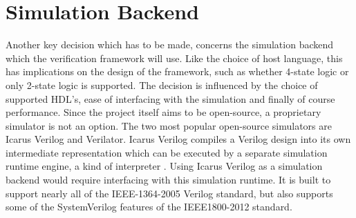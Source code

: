 \section{Simulation Backend} %

Another key decision which has to be made, concerns the simulation backend which the verification framework will use.
Like the choice of host language, this has implications on the design of the framework, such as whether 4-state logic
or only 2-state logic is supported.
The decision is influenced by the choice of supported HDL's, ease of interfacing with the simulation and
finally of course performance. Since the project itself aims to be open-source, a proprietary simulator
is not an option. The two most popular open-source simulators are Icarus Verilog and Verilator. Icarus Verilog
compiles a Verilog design into its own intermediate representation which can be executed by a separate simulation
runtime engine, a kind of interpreter \cite{iverilog}. Using Icarus Verilog as a simulation backend would require
interfacing with this simulation runtime. It is built to support nearly all of the IEEE-1364-2005 Verilog standard,
but also supports some of the SystemVerilog features of the IEEE1800-2012 standard.

